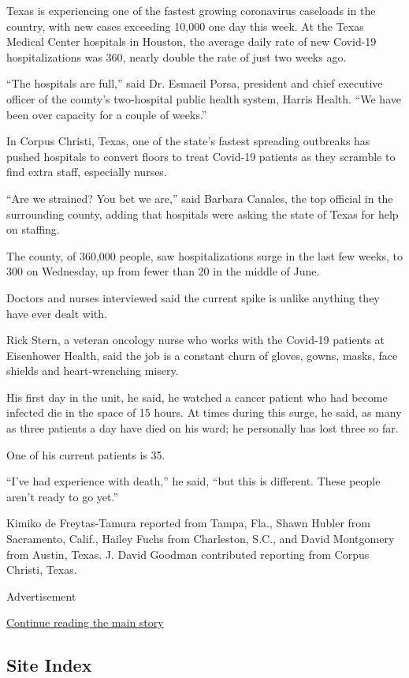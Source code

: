 Texas is experiencing one of the fastest growing coronavirus caseloads
in the country, with new cases exceeding 10,000 one day this week. At
the Texas Medical Center hospitals in Houston, the average daily rate of
new Covid-19 hospitalizations was 360, nearly double the rate of just
two weeks ago.

``The hospitals are full,'' said Dr. Esmaeil Porsa, president and chief
executive officer of the county's two-hospital public health system,
Harris Health. ``We have been over capacity for a couple of weeks.''

In Corpus Christi, Texas, one of the state's fastest spreading outbreaks
has pushed hospitals to convert floors to treat Covid-19 patients as
they scramble to find extra staff, especially nurses.

``Are we strained? You bet we are,'' said Barbara Canales, the top
official in the surrounding county, adding that hospitals were asking
the state of Texas for help on staffing.

The county, of 360,000 people, saw hospitalizations surge in the last
few weeks, to 300 on Wednesday, up from fewer than 20 in the middle of
June.

Doctors and nurses interviewed said the current spike is unlike anything
they have ever dealt with.

Rick Stern, a veteran oncology nurse who works with the Covid-19
patients at Eisenhower Health, said the job is a constant churn of
gloves, gowns, masks, face shields and heart-wrenching misery.

His first day in the unit, he said, he watched a cancer patient who had
become infected die in the space of 15 hours. At times during this
surge, he said, as many as three patients a day have died on his ward;
he personally has lost three so far.

One of his current patients is 35.

``I've had experience with death,'' he said, ``but this is different.
These people aren't ready to go yet.''

Kimiko de Freytas-Tamura reported from Tampa, Fla., Shawn Hubler from
Sacramento, Calif., Hailey Fuchs from Charleston, S.C., and David
Montgomery from Austin, Texas. J. David Goodman contributed reporting
from Corpus Christi, Texas.

Advertisement

\protect\hyperlink{after-bottom}{Continue reading the main story}

\hypertarget{site-index}{%
\subsection{Site Index}\label{site-index}}

